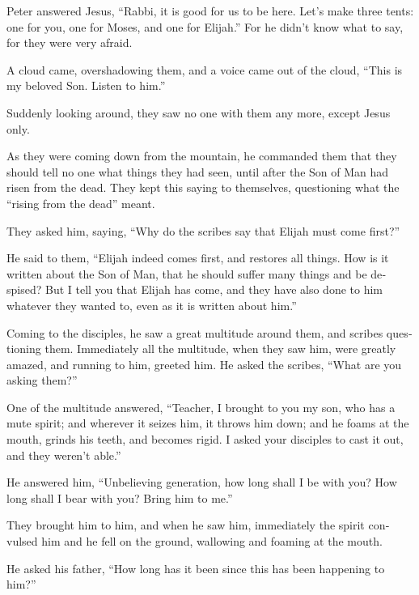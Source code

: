 \begin{paracol}{2}
\begin{otherlanguage}{english}
 Peter answered Jesus, ``Rabbi, it is good for us to be
here. Let's make three tents: one for you, one for Moses, and one for
Elijah.''  For he didn't know what to say, for they were
very afraid.

 A cloud came, overshadowing them, and a voice came out of
the cloud, ``This is my beloved Son. Listen to him.''

 Suddenly looking around, they saw no one with them any
more, except Jesus only.

 As they were coming down from the mountain, he commanded
them that they should tell no one what things they had seen, until after
the Son of Man had risen from the dead.  They kept this
saying to themselves, questioning what the ``rising from the dead''
meant.

 They asked him, saying, ``Why do the scribes say that
Elijah must come first?''

 He said to them, ``Elijah indeed comes first, and
restores all things. How is it written about the Son of Man, that he
should suffer many things and be despised?  But I tell
you that Elijah has come, and they have also done to him whatever they
wanted to, even as it is written about him.''

 Coming to the disciples, he saw a great multitude around
them, and scribes questioning them.  Immediately all the
multitude, when they saw him, were greatly amazed, and running to him,
greeted him.  He asked the scribes, ``What are you asking
them?''

 One of the multitude answered, ``Teacher, I brought to
you my son, who has a mute spirit;  and wherever it
seizes him, it throws him down; and he foams at the mouth, grinds his
teeth, and becomes rigid. I asked your disciples to cast it out, and
they weren't able.''

 He answered him, ``Unbelieving generation, how long
shall I be with you? How long shall I bear with you? Bring him to me.''

 They brought him to him, and when he saw him,
immediately the spirit convulsed him and he fell on the ground,
wallowing and foaming at the mouth.

 He asked his father, ``How long has it been since this
has been happening to him?''


\end{otherlanguage}
\end{paracol}
